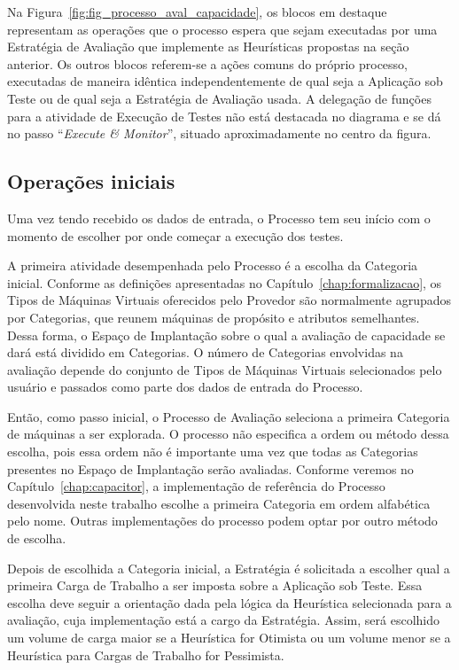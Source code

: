Na Figura~\ref{fig:fig_processo_aval_capacidade}, os blocos em destaque representam
as operações que o processo espera que sejam executadas por uma Estratégia de 
Avaliação que implemente as Heurísticas propostas na seção anterior. Os outros 
blocos referem-se a ações comuns do próprio processo, executadas de maneira 
idêntica independentemente de qual seja a Aplicação sob Teste ou de qual seja a 
Estratégia de Avaliação usada. A delegação de funções para a atividade de Execução
de Testes não está destacada no diagrama e se dá no passo ``\emph{Execute \& Monitor}'', 
situado aproximadamente no centro da figura.

\subsection{Operações iniciais}
\label{subsec:processo_operacoes_iniciais}
Uma vez tendo recebido os dados de entrada, o Processo tem seu início com o momento 
de escolher por onde começar a execução dos testes.

A primeira atividade desempenhada pelo Processo é a escolha da Categoria 
inicial. Conforme as definições apresentadas no Capítulo~\ref{chap:formalizacao}, 
os Tipos de Máquinas Virtuais oferecidos pelo Provedor são normalmente agrupados 
por Categorias, que reunem máquinas de propósito e atributos semelhantes. Dessa
forma, o Espaço de Implantação sobre o qual a avaliação de capacidade se dará está 
dividido em Categorias. O número de Categorias envolvidas na avaliação depende do 
conjunto de Tipos de Máquinas Virtuais selecionados pelo usuário e passados como
parte dos dados de entrada do Processo.

Então, como passo inicial, o Processo de Avaliação seleciona a primeira
Categoria de máquinas a ser explorada. O processo não especifica a ordem ou método 
dessa escolha, pois essa ordem não é importante uma vez que todas as Categorias 
presentes no Espaço de Implantação serão avaliadas. Conforme veremos no 
Capítulo~\ref{chap:capacitor}, a implementação de referência do Processo 
desenvolvida neste trabalho escolhe a primeira Categoria em ordem alfabética pelo
nome. Outras implementações do processo podem optar por outro método de escolha. 

Depois de escolhida a Categoria inicial, a Estratégia é solicitada a escolher 
qual a primeira Carga de Trabalho a ser imposta sobre a Aplicação sob Teste. Essa 
escolha deve seguir a orientação dada pela lógica da Heurística selecionada para 
a avaliação, cuja implementação está a cargo da Estratégia. Assim, será escolhido
um volume de carga maior se a Heurística for Otimista ou um volume menor se a
Heurística para Cargas de Trabalho for Pessimista.

